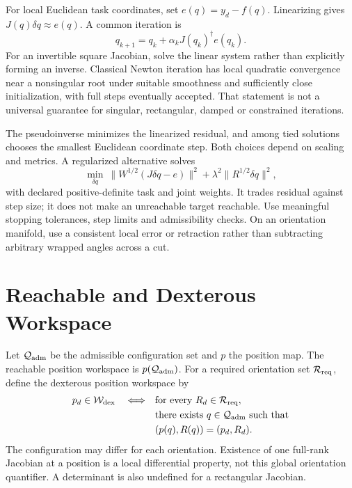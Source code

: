 For local Euclidean task coordinates, set $e(q)=y_d-f(q)$. Linearizing gives $J(q)\delta q\approx e(q)$. A common iteration is
\begin{equation}
 q_{k+1}=q_k+\alpha_kJ(q_k)^\dagger e(q_k).
\end{equation}
For an invertible square Jacobian, solve the linear system rather than explicitly forming an inverse. Classical Newton iteration has local quadratic convergence near a nonsingular root under suitable smoothness and sufficiently close initialization, with full steps eventually accepted. That statement is not a universal guarantee for singular, rectangular, damped or constrained iterations.

The pseudoinverse minimizes the linearized residual, and among tied solutions chooses the smallest Euclidean coordinate step. Both choices depend on scaling and metrics. A regularized alternative solves
\begin{equation}
 \min_{\delta q}\ \|W^{1/2}(J\delta q-e)\|^2
             +\lambda^2\|R^{1/2}\delta q\|^2,
\end{equation}
with declared positive-definite task and joint weights. It trades residual against step size; it does not make an unreachable target reachable. Use meaningful stopping tolerances, step limits and admissibility checks. On an orientation manifold, use a consistent local error or retraction rather than subtracting arbitrary wrapped angles across a cut.

\section{Reachable and Dexterous Workspace}
\label{sec:workspace}
\label{def:dexterous_workspace}
\label{def:reachable_workspace}

Let $\mathcal Q_{\rm adm}$ be the admissible configuration set and $p$ the position map. The reachable position workspace is $p(\mathcal Q_{\rm adm})$. For a required orientation set $\mathcal R_{\rm req}$, define the dexterous position workspace by
\begin{equation}
 \begin{aligned}
 p_d\in\mathcal W_{\rm dex}\quad\Longleftrightarrow\quad
 &\text{for every }R_d\in\mathcal R_{\rm req},\\
 &\text{there exists }q\in\mathcal Q_{\rm adm}\text{ such that}\\
 &(p(q),R(q))=(p_d,R_d).
 \end{aligned}
\end{equation}
The configuration may differ for each orientation. Existence of one full-rank Jacobian at a position is a local differential property, not this global orientation quantifier. A determinant is also undefined for a rectangular Jacobian.


